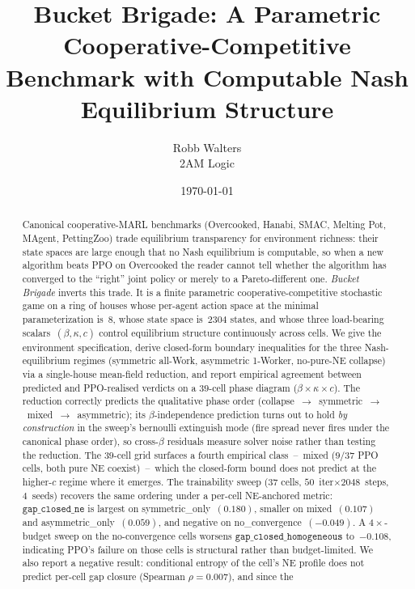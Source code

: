\documentclass{anvil-paper}
\title{Bucket Brigade: A Parametric Cooperative-Competitive Benchmark with
Computable Nash Equilibrium Structure}
\author{Robb Walters \\ 2AM Logic}
\date{\today}
\begin{document}
\maketitle

\begin{abstract}
Canonical cooperative-MARL benchmarks (Overcooked, Hanabi, SMAC, Melting Pot,
MAgent, PettingZoo) trade equilibrium transparency for environment richness:
their state spaces are large enough that no Nash equilibrium is computable, so
when a new algorithm beats PPO on Overcooked the reader cannot tell whether
the algorithm has converged to the ``right'' joint policy or merely to a
Pareto-different one. \emph{Bucket Brigade} inverts this trade. It is a finite
parametric cooperative-competitive stochastic game on a ring of houses whose
per-agent action space at the minimal parameterization is~$8$, whose state
space is~$2304$ states, and whose three load-bearing scalars~$(\beta,\kappa,c)$
control equilibrium structure continuously across cells. We give the
environment specification, derive closed-form boundary inequalities for the
three Nash-equilibrium regimes (symmetric all-Work, asymmetric 1-Worker,
no-pure-NE collapse) via a single-house mean-field reduction, and report
empirical agreement between predicted and PPO-realised verdicts on a
$39$-cell phase diagram ($\beta{\times}\kappa{\times}c$). The reduction
correctly predicts the qualitative phase order
(collapse~$\to$~symmetric~$\to$~mixed~$\to$~asymmetric); its
$\beta$-independence prediction turns out to hold \emph{by construction}
in the sweep's bernoulli extinguish mode (fire spread never fires under
the canonical phase order), so cross-$\beta$ residuals measure solver
noise rather than testing the reduction. The $39$-cell grid surfaces a
fourth empirical
class~--~\textsf{mixed} ($9/37$ PPO cells, both pure NE coexist)~--~which
the closed-form bound does not predict at the higher-$c$ regime where it
emerges. The trainability sweep ($37$ cells, $50$~iter${\times}2048$~steps,
$4$~seeds) recovers the same ordering under a per-cell NE-anchored metric:
$\texttt{gap\_closed\_ne}$ is largest on \textsf{symmetric\_only}~$(0.180)$,
smaller on \textsf{mixed}~$(0.107)$ and \textsf{asymmetric\_only}~$(0.059)$,
and negative on \textsf{no\_convergence}~$(-0.049)$. A
$4{\times}$-budget sweep on the no-convergence cells worsens
$\texttt{gap\_closed\_homogeneous}$ to~$-0.108$, indicating PPO's failure on
those cells is structural rather than budget-limited. We also report a
negative result: conditional entropy of the cell's NE profile does not
predict per-cell gap closure (Spearman $\rho{=}0.007$), and since the

\end{abstract}
\end{document}
